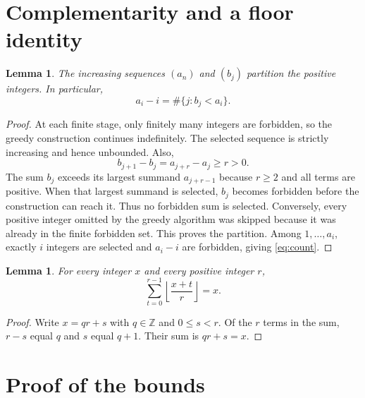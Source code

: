 \documentclass[11pt]{article}
\newtheorem{lemma}[theorem]{Lemma}
\theoremstyle{remark}
\newcommand{\floor}[1]{\left\lfloor #1\right\rfloor}
\begin{document}
\section{Complementarity and a floor identity}

\begin{lemma}\label{lem:partition}
The increasing sequences $(a_n)$ and $(b_j)$ partition the positive integers.
In particular,
\begin{equation}\label{eq:count}
a_i-i=\#\{j:b_j<a_i\}.
\end{equation}
\end{lemma}

\begin{proof}
At each finite stage, only finitely many integers are forbidden, so the greedy
construction continues indefinitely. The selected sequence is strictly
increasing and hence unbounded. Also,
\[
b_{j+1}-b_j=a_{j+r}-a_j\ge r>0.
\]
The sum $b_j$ exceeds its largest summand $a_{j+r-1}$ because $r\ge2$ and
all terms are positive. When that largest summand is selected, $b_j$ becomes
forbidden before the construction can reach it. Thus no forbidden sum is
selected. Conversely, every positive integer omitted by the greedy algorithm
was skipped because it was already in the finite forbidden set. This proves
the partition. Among $1,\ldots,a_i$, exactly $i$ integers are selected and
$a_i-i$ are forbidden, giving \eqref{eq:count}.
\end{proof}

\begin{lemma}\label{lem:floor}
For every integer $x$ and every positive integer $r$,
\[
\sum_{t=0}^{r-1}\floor{\frac{x+t}{r}}=x.
\]
\end{lemma}

\begin{proof}
Write $x=qr+s$ with $q\in\mathbb Z$ and $0\le s<r$. Of the $r$ terms in
the sum, $r-s$ equal $q$ and $s$ equal $q+1$. Their sum is $qr+s=x$.
\end{proof}

\section{Proof of the bounds}
\end{document}
